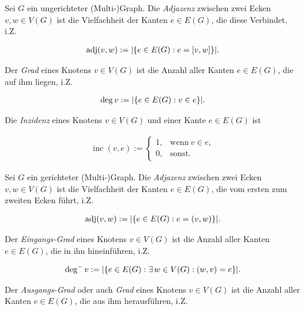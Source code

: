\begin{definition}

    Sei $G$ ein ungerichteter (Multi-)Graph.
    Die \textit{Adjazenz} zwischen zwei Ecken $v, w \in V(G)$ ist die Vielfachheit der Kanten $e \in E(G)$, die diese Verbindet, i.Z.

    \begin{align*}
        \operatorname{adj}(v, w)
        :=
        |{\left \{ e \in E(G): e = [v, w] \right \}}|.
    \end{align*}

    Der \textit{Grad} eines Knotens $v \in V(G)$ ist die Anzahl aller Kanten $e \in E(G)$, die auf ihm liegen, i.Z.

    \begin{align*}
        \deg v
        :=
        |{\left \{ e \in E(G): v \in e \right \}}|.
    \end{align*}

    Die \textit{Inzidenz} eines Knotens $v \in V(G)$ und einer Kante $e \in E(G)$ ist

    \begin{align*}
        \operatorname{inc}(v, e)
        :=
        \begin{cases}
            1, & \text{wenn}~ v \in e, \\
            0, & \text{sonst}.
        \end{cases}
    \end{align*}

    Sei $G$ ein gerichteter (Multi-)Graph.
    Die \textit{Adjazenz} zwischen zwei Ecken $v, w \in V(G)$ ist die Vielfachheit der Kanten $e \in E(G)$, die vom ersten zum zweiten Ecken führt, i.Z.

    \begin{align*}
        \operatorname{adj}(v, w)
        :=
        |{\left \{ e \in E(G): e = (v, w) \right \}}|.
    \end{align*}

    Der \textit{Eingangs-Grad} eines Knotens $v \in V(G)$ ist die Anzahl aller Kanten $e \in E(G)$, die in ihn hineinführen, i.Z.

    \begin{align*}
        \deg^- v
        :=
        |{\left \{ e \in E(G): \exists \, w \in V(G): (w, v) = e \right \}}|.
    \end{align*}

    Der \textit{Ausgangs-Grad} oder auch \textit{Grad} eines Knotens $v \in V(G)$ ist die Anzahl aller Kanten $e \in E(G)$, die aus ihm herausführen, i.Z.


\end{definition}
